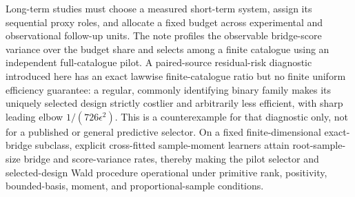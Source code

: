 Long-term studies must choose a measured short-term system, assign its sequential proxy roles, and allocate a fixed budget across experimental and observational follow-up units.  The note profiles the observable bridge-score variance over the budget share and selects among a finite catalogue using an independent full-catalogue pilot.  A paired-source residual-risk diagnostic introduced here has an exact lawwise finite-catalogue ratio but no finite uniform efficiency guarantee: a regular, commonly identifying binary family makes its uniquely selected design strictly costlier and arbitrarily less efficient, with sharp leading elbow \(1/(726\epsilon^2)\).  This is a counterexample for that diagnostic only, not for a published or general predictive selector.  On a fixed finite-dimensional exact-bridge subclass, explicit cross-fitted sample-moment learners attain root-sample-size bridge and score-variance rates, thereby making the pilot selector and selected-design Wald procedure operational under primitive rank, positivity, bounded-basis, moment, and proportional-sample conditions.